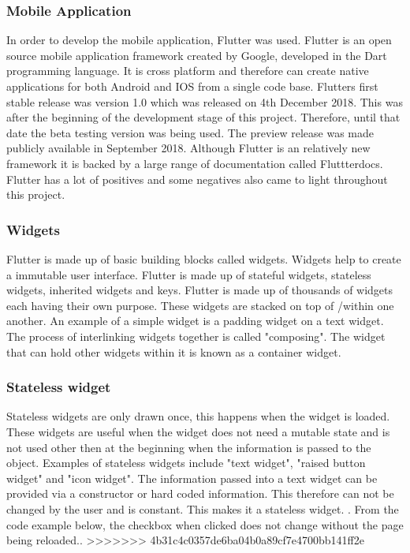 \subsubsection{Mobile Application}
In order to develop the mobile application, Flutter was used. Flutter is an open source mobile application framework created by Google, developed in the Dart programming language. It is cross platform and therefore can create native applications for both Android and IOS from a single code base. Flutters first stable release was version 1.0 which was released on 4th December 2018. This was after the beginning of the development stage of this project. Therefore, until that date the beta testing version was being used. The preview release was made publicly available in September 2018. Although Flutter is an relatively new framework it is backed by a large range of documentation called Fluttterdocs. Flutter has a lot of positives and some negatives also came to light throughout this project.

\subsubsection{Widgets}
Flutter is made up of basic building blocks called widgets. Widgets help to create a immutable user interface. Flutter is made up of stateful widgets, stateless widgets, inherited widgets and keys. Flutter is made up of thousands of widgets each having their own purpose. These widgets are stacked on top of /within one another. An example of a simple widget is a padding widget on a text widget. The process of interlinking widgets together is called "composing". The widget that can hold other widgets within it is known as a container widget.\cite{widgets}

\subsubsection{Stateless widget}
Stateless widgets are only drawn once, this happens when the widget is loaded. These widgets are useful when the widget does not need a mutable state and is not used other then at the beginning when the information is passed to the object. Examples of stateless widgets include "text widget", "raised button widget" and "icon widget". The information passed into a text widget can be provided via a constructor or hard coded information. This therefore can not be changed by the user and is constant. This makes it a stateless widget. \cite{birch_2019}. From the code example below, the checkbox when clicked does not change without the page being reloaded.\cite{stateful_widgets_2018}.
>>>>>>> 4b31c4c0357de6ba04b0a89cf7e4700bb141ff2e

